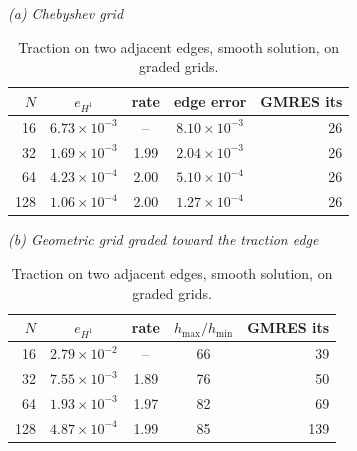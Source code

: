 \documentclass[11pt]{article}
\begin{document}
\clearpage
\begin{table}[htbp]\centering\small
\caption{Traction on two adjacent edges, smooth solution, on graded grids.}
\textit{(a) Chebyshev grid}\\[2pt]
\begin{tabular}{r cc c r}
\toprule
$N$ & $e_{H^1}$ & rate & edge error & GMRES its\\
\midrule
16 & $6.73{\times}10^{-3}$ & -- & $8.10{\times}10^{-3}$ & 26\\
32 & $1.69{\times}10^{-3}$ & 1.99 & $2.04{\times}10^{-3}$ & 26\\
64 & $4.23{\times}10^{-4}$ & 2.00 & $5.10{\times}10^{-4}$ & 26\\
128 & $1.06{\times}10^{-4}$ & 2.00 & $1.27{\times}10^{-4}$ & 26\\
\bottomrule
\end{tabular}

\medskip
\textit{(b) Geometric grid graded toward the traction edge}\\[2pt]
\begin{tabular}{r cc c r}
\toprule
$N$ & $e_{H^1}$ & rate & $h_{\max}/h_{\min}$ & GMRES its\\
\midrule
16 & $2.79{\times}10^{-2}$ & -- & 66 & 39\\
32 & $7.55{\times}10^{-3}$ & 1.89 & 76 & 50\\
64 & $1.93{\times}10^{-3}$ & 1.97 & 82 & 69\\
128 & $4.87{\times}10^{-4}$ & 1.99 & 85 & 139\\
\bottomrule
\end{tabular}
\end{table}
\end{document}
